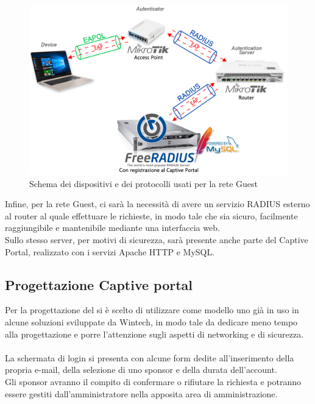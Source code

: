 \documentclass[Realizzazione.tex]{subfiles}
\begin{document}
\newpage
\begin{figure}[H]
	\centering
	\includegraphics[width=1.1\linewidth]{"images/Schema_tecnologie_RADIUS"}
	\caption{Schema dei dispositivi e dei protocolli usati per la rete Guest}
	\label{fig:Schema dei dispositivi e dei protocolli usati per la rete Guest}
\end{figure}
Infine, per la rete Guest, ci sarà la necessità di avere un servizio RADIUS esterno al router al quale effettuare le richieste, in modo tale che sia sicuro, facilmente raggiungibile e mantenibile mediante una interfaccia web. \\
Sullo stesso server, per motivi di sicurezza, sarà presente anche parte del Captive Portal, realizzato con i servizi Apache HTTP e MySQL.

\newpage
\subsection{Progettazione Captive portal}
Per la progettazione del  si è scelto di utilizzare come modello uno già in uso in alcune soluzioni sviluppate da Wintech, in modo tale da dedicare meno tempo alla progettazione e porre l'attenzione sugli aspetti di networking e di sicurezza. \\\\
La schermata di login si presenta con alcune form dedite all'inserimento della propria e-mail, della selezione di uno sponsor e della durata dell'account. \\
Gli sponsor avranno il compito di confermare o rifiutare la richiesta e potranno essere gestiti dall'amministratore nella apposita area di amministrazione. \\
\end{document}
